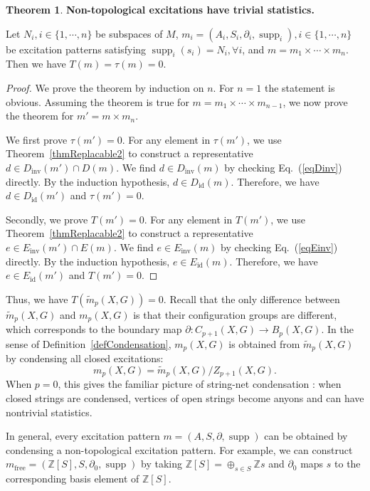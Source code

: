 \documentclass[reprint, amsmath, amssymb, showpacs, floatfix, longbibliography, aps, twocolumn, superscriptaddress, nofootinbib]{revtex4-2}
\newcommand{\ZZ}{{\mathbb Z}}
\newcommand{\supp}{\operatorname{supp}}
\theoremstyle{definition}
\newtheorem{theorem}{Theorem}[section]
\begin{document}
\begin{theorem}\label{thmDirectSum}
	\textbf{Non-topological excitations have trivial statistics.}
	
	Let $N_i,i\in\{1,\cdots,n\}$ be subspaces of $M$, $m_i=(A_i,S_i,\partial_i,\supp_i),i\in\{1,\cdots,n\}$ be excitation patterns satisfying $\supp_i(s_i)=N_i,\forall i$, and $m=m_1\times \cdots\times m_n$. Then we have $T(m)=\tau(m)=0$.
\end{theorem}
\begin{proof}
	We prove the theorem by induction on $n$. For $n=1$ the statement is obvious. Assuming the theorem is true for $m=m_1\times\cdots\times m_{n-1}$, we now prove the theorem for $m'=m\times m_{n}$.
	
	We first prove $\tau(m')=0$. For any element in $\tau(m')$, we use Theorem~\ref{thmReplacable2} to construct a representative $d\in D_{\operatorname{inv}}(m')\cap D(m)$. We find $d\in D_{\operatorname{inv}}(m)$ by checking Eq.~(\ref{eqDinv}) directly. By the induction hypothesis, $d\in D_{\operatorname{id}}(m)$. Therefore, we have $d\in D_{\operatorname{id}}(m')$ and $\tau(m')=0$.
	
	Secondly, we prove $T(m')=0$. For any element in $T(m')$, we use Theorem~\ref{thmReplacable2} to construct a representative $e\in E_{\operatorname{inv}}(m')\cap E(m)$. We find $e\in E_{\operatorname{inv}}(m)$ by checking Eq.~(\ref{eqEinv}) directly. By the induction hypothesis, $e\in E_{\operatorname{id}}(m)$. Therefore, we have $e\in E_{\operatorname{id}}(m')$ and $T(m')=0$.
\end{proof}

Thus, we have $T(\tilde{m}_p(X,G))=0$. Recall that the only difference between $\tilde{m}_p(X,G)$ and $m_p(X,G)$ is that their configuration groups are different, which corresponds to the boundary map $\partial:C_{p+1}(X,G)\rightarrow B_p(X,G)$. In the sense of Definition~\ref{defCondensation}, $m_p(X,G)$ is obtained from $\tilde{m}_p(X,G)$ by condensing all closed excitations:
\begin{equation}
	m_p(X,G)=\tilde{m}_p(X,G)/Z_{p+1}(X,G).
\end{equation}
When $p=0$, this gives the familiar picture of string-net condensation \cite{Levin_2005}: when closed strings are condensed, vertices of open strings become anyons and can have nontrivial statistics.

In general, every excitation pattern $m=(A,S,\partial,\supp)$ can be obtained by condensing a non-topological excitation pattern. For example, we can construct $m_{\operatorname{free}}=( \ZZ[S],S,\partial_0,\supp)$ by taking $\ZZ[S]=\oplus_{s\in S}\ZZ s$ and $\partial_0$ maps $s$ to the corresponding basis element of $\ZZ[S]$.
\end{document}
